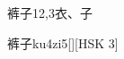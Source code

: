 \begin{entry}{裤子}{12,3}{⾐、⼦}
  \begin{phonetics}{裤子}{ku4zi5}[][HSK 3]
  \end{phonetics}
\end{entry}
